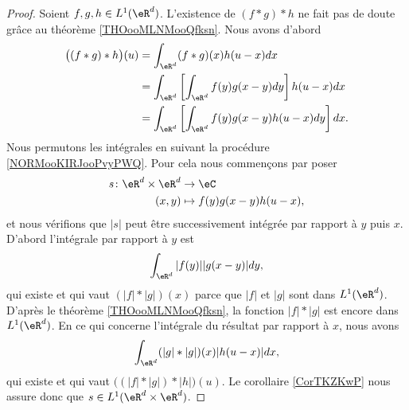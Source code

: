 \begin{proof}
    Soient \( f,g,h\in L^1(\eR^d)\). L'existence de \( (f*g)*h\) ne fait pas de doute grâce au théorème \ref{THOooMLNMooQfksn}. Nous avons d'abord
    \begin{subequations}
        \begin{align}
            \big( (f*g)*h \big)(u)&=\int_{\eR^d}(f*g)(x)h(u-x)dx\\
            &=\int_{\eR^d}\left[ \int_{\eR^d}f(y)g(x-y)dy \right]h(u-x)dx\\
            &=\int_{\eR^d}\left[ \int_{\eR^d}f(y)g(x-y)h(u-x)dy \right]dx.      \label{SUBEQooJKRHooDaScXV}
        \end{align}
    \end{subequations}
    Nous permutons les intégrales en suivant la procédure \ref{NORMooKIRJooPvyPWQ}. Pour cela nous commençons par poser
    \begin{equation}
        \begin{aligned}
            s\colon \eR^d\times \eR^d&\to \eC \\
            (x,y)&\mapsto f(y)g(x-y)h(u-x),
        \end{aligned}
    \end{equation}
    et nous vérifions que \( | s |\) peut être successivement intégrée par rapport à \( y\) puis \( x\). D'abord l'intégrale par rapport à \( y\) est
    \begin{equation}
        \int_{\eR^d}| f(y) | |g(x-y) |dy,
    \end{equation}
    qui existe et qui vaut \(   (| f |*| g |)(x)   \) parce que \( | f |\) et \( | g |\) sont dans \( L^1(\eR^d)\). D'après le théorème \ref{THOooMLNMooQfksn}, la fonction \( | f |*| g |\) est encore dans \( L^1(\eR^d)\). En ce qui concerne l'intégrale du résultat par rapport à \( x\), nous avons
    \begin{equation}
        \int_{\eR^d}(| g |*| g |)(x)| h(u-x) |dx,
    \end{equation}
    qui existe et qui vaut \( \big( (| f |*| g |)*| h |\big)(u)\). Le corollaire \ref{CorTKZKwP} nous assure donc que \( s\in L^1(\eR^d\times \eR^d)\).


\end{proof}
